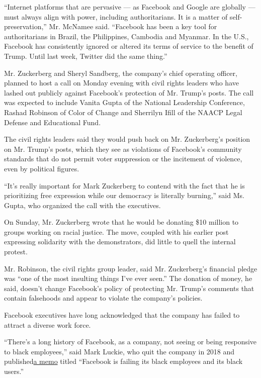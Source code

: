 ``Internet platforms that are pervasive --- as Facebook and Google are
globally --- must always align with power, including authoritarians. It
is a matter of self-preservation,'' Mr. McNamee said. ``Facebook has
been a key tool for authoritarians in Brazil, the Philippines, Cambodia
and Myanmar. In the U.S., Facebook has consistently ignored or altered
its terms of service to the benefit of Trump. Until last week, Twitter
did the same thing.''

Mr. Zuckerberg and Sheryl Sandberg, the company's chief operating
officer, planned to host a call on Monday evening with civil rights
leaders who have lashed out publicly against Facebook's protection of
Mr. Trump's posts. The call was expected to include Vanita Gupta of the
National Leadership Conference, Rashad Robinson of Color of Change and
Sherrilyn Ifill of the NAACP Legal Defense and Educational Fund.

The civil rights leaders said they would push back on Mr. Zuckerberg's
position on Mr. Trump's posts, which they see as violations of
Facebook's community standards that do not permit voter suppression or
the incitement of violence, even by political figures.

``It's really important for Mark Zuckerberg to contend with the fact
that he is prioritizing free expression while our democracy is literally
burning,'' said Ms. Gupta, who organized the call with the executives.

On Sunday, Mr. Zuckerberg wrote that he would be donating \$10 million
to groups working on racial justice. The move, coupled with his earlier
post expressing solidarity with the demonstrators, did little to quell
the internal protest.

Mr. Robinson, the civil rights group leader, said Mr. Zuckerberg's
financial pledge was ``one of the most insulting things I've ever
seen.'' The donation of money, he said, doesn't change Facebook's policy
of protecting Mr. Trump's comments that contain falsehoods and appear to
violate the company's policies.

Facebook executives have long acknowledged that the company has failed
to attract a diverse work force.

``There's a long history of Facebook, as a company, not seeing or being
responsive to black employees,'' said Mark Luckie, who quit the company
in 2018 and
published\href{https://www.facebookcorewwwi.onion/notes/mark-s-luckie/facebook-is-failing-its-black-employees-and-its-black-users/1931075116975013/}{a
memo} titled ``Facebook is failing its black employees and its black
users.''

